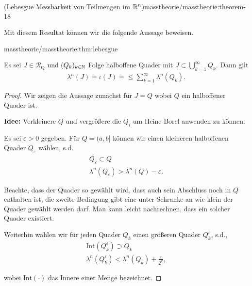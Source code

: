 \begin{theorem}{(Lebesgue Messbarkeit von Teilmengen im \protect\(\mathbb{R}^n\protect\))}{masstheorie/masstheorie:theorem-18}
\par
Mit diesem Resultat können wir die folgende Aussage beweisen.
\begin{theorem}{}{masstheorie/masstheorie:thm:lebesgue}



\par
Es sei \(J\in\mathcal{R}_{\text{Q}}\) und \((Q_k)_{k\in\mathbb{N}}\) Folge halboffene Quader mit \(J \subset \bigcup_{k=1}^\infty Q_k\).
Dann gilt
\begin{align*}
\lambda^n(J) = \iota(J) = \leq \sum_{k=1}^\infty \lambda^n(Q_k).
\end{align*}\end{theorem}

\begin{proof}
 Wir zeigen die Aussage zunächst für \(J=Q\) wobei \(Q\) ein halboffener Quader ist.

\par
\textbf{Idee:} Verkleinere \(Q\) und vergrößere die \(Q_i\) um Heine Borel anwenden zu können.

\par
Es sei \(\varepsilon>0\) gegeben. Für \(Q=(a,b]\) können wir einen kleineren halboffenen Quader \(Q_\varepsilon\) wählen, s.d.
\begin{align*}
\overline{Q_\varepsilon} \subset Q\\
\lambda^n(Q_\varepsilon) > \lambda^n(Q) - \varepsilon.
\end{align*}
\par
Beachte, dass der Quader so gewählt wird, dass auch sein Abschluss noch in \(Q\) enthalten ist, die zweite Bedingung gibt eine unter Schranke an wie klein der Quader gewählt werden darf. Man kann leicht nachrechnen, dass ein solcher Quader existiert.

\par
Weiterhin wählen wir für jeden Quader \(Q_k\) einen größeren Quader \(Q_k^\varepsilon\), s.d.,
\begin{align*}
\text{Int}(Q_k^\varepsilon)\supset Q_k\\
\lambda^n(Q_k^\varepsilon) < \lambda^n(Q_k) + \frac{\varepsilon}{2^k},
\end{align*}
\par
wobei \(\text{Int}(\cdot)\) das Innere einer Menge bezeichnet.


\end{proof}
\end{theorem}
